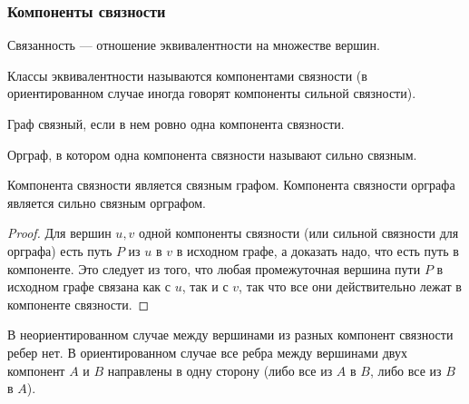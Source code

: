 \subsubsection*{Компоненты связности}

\begin{defn}
    Связанность --- отношение эквивалентности на множестве вершин.
\end{defn}

\begin{defn}
    Классы эквивалентности называются компонентами связности (в ориентированном случае иногда говорят компоненты сильной связности).
\end{defn}

\begin{defn}
    Граф связный, если в нем ровно одна компонента связности.
\end{defn}

\begin{defn}
    Орграф, в котором одна компонента связности называют сильно связным.
\end{defn}

\begin{statement}
    Компонента связности является связным графом. Компонента связности орграфа является сильно связным орграфом.
\end{statement}

\begin{proof}

    Для вершин $u, v$ одной компоненты связности (или сильной связности для орграфа) есть путь $P$ из $u$ в $v$ в исходном графе, а доказать надо, что есть путь в компоненте. Это следует из того, что любая промежуточная вершина пути $P$ в исходном графе связана как с $u$, так и с $v$, так что все они действительно лежат в компоненте связности.

\end{proof}

В неориентированном случае между вершинами из разных компонент связности ребер нет. В ориентированном случае все ребра между вершинами двух компонент $A$ и $B$ направлены в одну сторону (либо все из $A$ в $B$, либо все из $B$ в $A$).